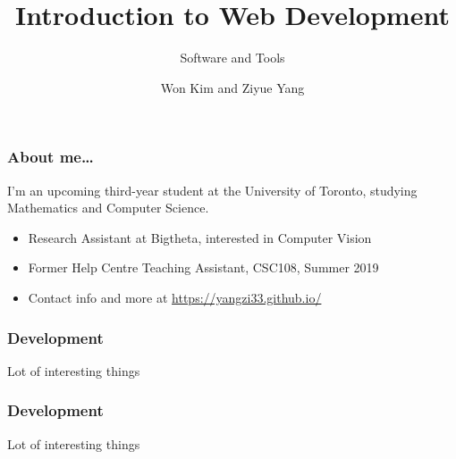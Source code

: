 \documentclass[aspectratio=169]{beamer}              %
\title{Introduction to Web Development}
\subtitle{Software and Tools}
\author{Won Kim and Ziyue Yang}
\institute{bigtheta.org}
\date{}
\begin{document}
\begin{frame}
  \titlepage
\end{frame}

\begin{frame}
    \frametitle{About me\dots}
    I'm an upcoming third-year student at the University of Toronto, studying Mathematics
    and Computer Science. 
\begin{itemize}
  \item Research Assistant at Bigtheta, interested in Computer Vision
  \item Former Help Centre Teaching Assistant, CSC108, Summer 2019 
  \item Contact info and more at \url{https://yangzi33.github.io/} 
\end{itemize}

\end{frame}


\begin{frame}
    \frametitle{Development}

    Lot of interesting things

\end{frame}


\begin{frame}
    \frametitle{Development}

    Lot of interesting things

\end{frame}
\end{document}
